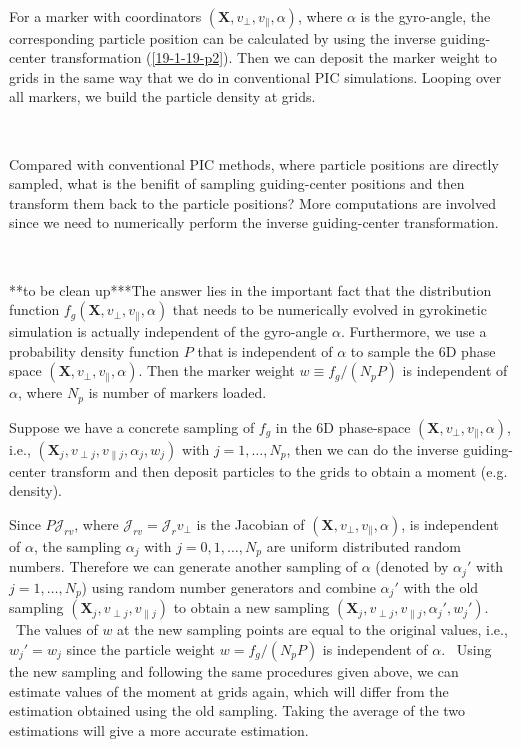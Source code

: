 \documentclass{llncs}
\begin{document}
\

For a marker with coordinators $(\mathbf{X}, v_{\perp}, v_{\parallel},
\alpha)$, where $\alpha$ is the gyro-angle, the corresponding particle
position can be calculated by using the inverse guiding-center transformation
(\ref{19-1-19-p2}). Then we can deposit the marker weight to grids in the same
way that we do in conventional PIC simulations. Looping over all markers, we
build the particle density at grids.

\

Compared with conventional PIC methods, where particle positions are directly
sampled, what is the benifit of sampling guiding-center positions and then
transform them back to the particle positions? More computations are involved
since we need to numerically perform the inverse guiding-center
transformation.

\

**to be clean up***The answer lies in the important fact that the
distribution function $f_g (\mathbf{X}, v_{\perp}, v_{\parallel}, \alpha)$
that needs to be numerically evolved in gyrokinetic simulation is actually
independent of the gyro-angle $\alpha$. Furthermore, we use a probability
density function $P$ that is independent of $\alpha$ to sample the 6D phase
space $(\mathbf{X}, v_{\perp}, v_{\parallel}, \alpha)$. Then the marker weight
$w \equiv f_g / (N_p P)$ is independent of $\alpha$, where $N_p$ is number of
markers loaded.

Suppose we have a concrete sampling of $f_g$ in the 6D phase-space
$(\mathbf{X}, v_{\perp}, v_{\parallel}, \alpha)$, i.e., $(\mathbf{X}_j,
v_{\perp j}, v_{\parallel j}, \alpha_j, w_j)$ with $j = 1, \ldots, N_p$, then
we can do the inverse guiding-center transform and then deposit particles to
the grids to obtain a moment (e.g. density).

Since $P \mathcal{J}_{r v}$, where $\mathcal{J}_{r v} = \mathcal{J}_r
v_{\perp}$ is the Jacobian of $(\mathbf{X}, v_{\perp}, v_{\parallel},
\alpha)$, is independent of $\alpha$, the sampling $\alpha_j$ with $j = 0, 1,
\ldots, N_p$ are uniform distributed random numbers. Therefore we can generate
another sampling of $\alpha$ (denoted by $\alpha_j'$ with $j = 1, \ldots,
N_p$) using random number generators and combine $\alpha_j'$ with the old
sampling $(\mathbf{X}_j, v_{\perp j}, v_{\parallel j})$ to obtain a new
sampling $(\mathbf{X}_j, v_{\perp j}, v_{\parallel j}, \alpha_j', w_j')$. \
The values of $w$ at the new sampling points are equal to the original values,
i.e., $w_j' = w_j$ since the particle weight $w = f_g / (N_p P)$ is
independent of $\alpha$. \ Using the new sampling and following the same
procedures given above, we can estimate values of the moment at grids again,
which will differ from the estimation obtained using the old sampling. Taking
the average of the two estimations will give a more accurate estimation.
\end{document}
